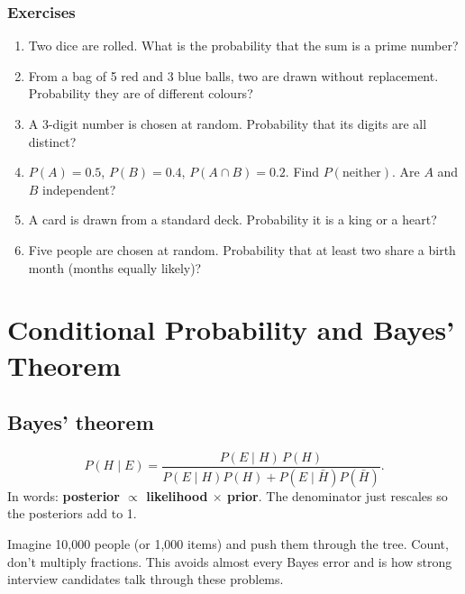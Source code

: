 \documentclass[11pt,a4paper,openany]{report}
\newenvironment{exercises}{\subsection*{Exercises \thechapter}\begin{enumerate}[label=\textbf{\thechapter.\arabic*},leftmargin=3.2em]}{\end{enumerate}}
\begin{document}
\begin{exercises}
\item Two dice are rolled. What is the probability that the sum is a prime number?
\item From a bag of 5 red and 3 blue balls, two are drawn without replacement. Probability they are of different colours?
\item A 3-digit number is chosen at random. Probability that its digits are all distinct?
\item $P(A)=0.5$, $P(B)=0.4$, $P(A\cap B)=0.2$. Find $P(\text{neither})$. Are $A$ and $B$ independent?
\item A card is drawn from a standard deck. Probability it is a king or a heart?
\item Five people are chosen at random. Probability that at least two share a birth month (months equally likely)?
\end{exercises}

\chapter{Conditional Probability and Bayes' Theorem}\label{ch:bayes}

\section{Bayes' theorem}
\[P(H\mid E)=\frac{P(E\mid H)\,P(H)}{P(E\mid H)P(H)+P(E\mid \bar H)P(\bar H)}.\]
In words: \textbf{posterior $\propto$ likelihood $\times$ prior}. The denominator just rescales so the posteriors add to 1.

\begin{shortcut}
Imagine 10{,}000 people (or 1{,}000 items) and push them through the tree. Count, don't multiply fractions. This avoids almost every Bayes error and is how strong interview candidates talk through these problems.
\end{shortcut}
\end{document}
